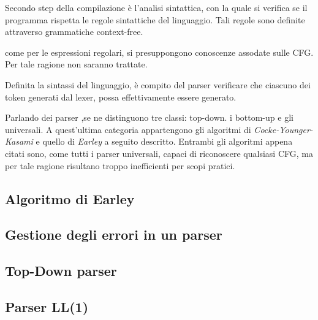 \documentclass{subfiles}
\begin{document}
Secondo step della compilazione è l'analisi sintattica, con la quale si verifica se il programma rispetta le regole sintattiche del linguaggio.
Tali regole sono definite attraverso grammatiche context-free.

\begin{Note*}
    come per le espressioni regolari, si presuppongono conoscenze assodate sulle CFG.
    Per tale ragione non saranno trattate.
\end{Note*}
Definita la sintassi del linguaggio, è compito del parser verificare che ciascuno dei token generati dal lexer, possa effettivamente essere generato.

Parlando dei parser ,se ne distinguono tre classi: top-down. i bottom-up e gli universali.
A quest'ultima categoria appartengono gli algoritmi di \emph{Cocke-Younger-Kasami} e quello di \emph{Earley} a seguito descritto.
Entrambi gli algoritmi appena citati sono, come tutti i parser universali, capaci di riconoscere qualsiasi CFG,
ma per tale ragione risultano troppo inefficienti per scopi pratici.

\subsection{Algoritmo di Earley}

\clearpage

\subsection{Gestione degli errori in un parser}


\subsection{Top-Down parser}


\subsection{Parser LL(1)}

\end{document}

